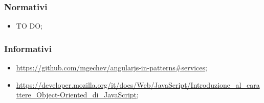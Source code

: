 		\subsubsection{Normativi} %
		\label{ssub:normativi}
			\begin{itemize}
				\item TO DO;
			\end{itemize}

		\subsubsection{Informativi} %
		\label{ssub:informativi}
			\begin{itemize}
				\item \url{https://github.com/mgechev/angularjs-in-patterns#services};
				\item \url{https://developer.mozilla.org/it/docs/Web/JavaScript/Introduzione_al_carattere_Object-Oriented_di_JavaScript};
			\end{itemize}
